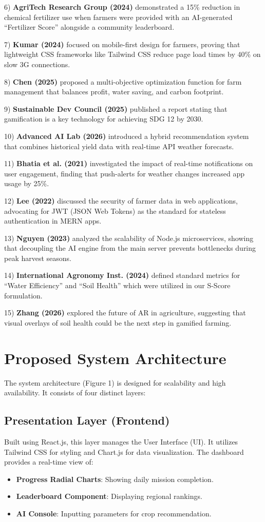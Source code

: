 \documentclass[journal]{IEEEtran}
\begin{document}
6) \textbf{AgriTech Research Group (2024)} demonstrated a 15\% reduction in chemical fertilizer use when farmers were provided with an AI-generated ``Fertilizer Score'' alongside a community leaderboard.

7) \textbf{Kumar (2024)} focused on mobile-first design for farmers, proving that lightweight CSS frameworks like Tailwind CSS reduce page load times by 40\% on slow 3G connections.

8) \textbf{Chen (2025)} proposed a multi-objective optimization function for farm management that balances profit, water saving, and carbon footprint.

9) \textbf{Sustainable Dev Council (2025)} published a report stating that gamification is a key technology for achieving SDG 12 by 2030.

10) \textbf{Advanced AI Lab (2026)} introduced a hybrid recommendation system that combines historical yield data with real-time API weather forecasts.

11) \textbf{Bhatia et al. (2021)} investigated the impact of real-time notifications on user engagement, finding that push-alerts for weather changes increased app usage by 25\%.

12) \textbf{Lee (2022)} discussed the security of farmer data in web applications, advocating for JWT (JSON Web Tokens) as the standard for stateless authentication in MERN apps.

13) \textbf{Nguyen (2023)} analyzed the scalability of Node.js microservices, showing that decoupling the AI engine from the main server prevents bottlenecks during peak harvest seasons.

14) \textbf{International Agronomy Inst. (2024)} defined standard metrics for ``Water Efficiency'' and ``Soil Health'' which were utilized in our S-Score formulation.

15) \textbf{Zhang (2026)} explored the future of AR in agriculture, suggesting that visual overlays of soil health could be the next step in gamified farming.

\section{Proposed System Architecture}
The system architecture (Figure 1) is designed for scalability and high availability. It consists of four distinct layers:

\subsection{Presentation Layer (Frontend)}
Built using React.js, this layer manages the User Interface (UI). It utilizes Tailwind CSS for styling and Chart.js for data visualization. The dashboard provides a real-time view of:
\begin{itemize}
    \item \textbf{Progress Radial Charts}: Showing daily mission completion.
    \item \textbf{Leaderboard Component}: Displaying regional rankings.
    \item \textbf{AI Console}: Inputting parameters for crop recommendation.
\end{itemize}
\end{document}
